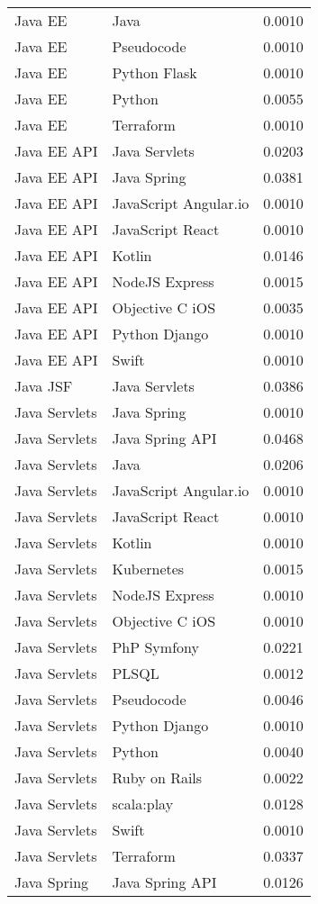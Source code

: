 {\begin{longtable}{lll}
Java EE & Java & 0.0010\\
Java EE & Pseudocode & 0.0010\\
Java EE & Python Flask & 0.0010\\
Java EE & Python & 0.0055\\
Java EE & Terraform & 0.0010\\
Java EE API & Java Servlets & 0.0203\\
Java EE API & Java Spring & 0.0381\\
Java EE API & JavaScript Angular.io & 0.0010\\
Java EE API & JavaScript React & 0.0010\\
Java EE API & Kotlin & 0.0146\\
Java EE API & NodeJS Express & 0.0015\\
Java EE API & Objective C iOS & 0.0035\\
Java EE API & Python Django & 0.0010\\
Java EE API & Swift & 0.0010\\
Java JSF & Java Servlets & 0.0386\\
Java Servlets & Java Spring & 0.0010\\
Java Servlets & Java Spring API & 0.0468\\
Java Servlets & Java & 0.0206\\
Java Servlets & JavaScript Angular.io & 0.0010\\
Java Servlets & JavaScript React & 0.0010\\
Java Servlets & Kotlin & 0.0010\\
Java Servlets & Kubernetes & 0.0015\\
Java Servlets & NodeJS Express & 0.0010\\
Java Servlets & Objective C iOS & 0.0010\\
Java Servlets & PhP Symfony & 0.0221\\
Java Servlets & PLSQL & 0.0012\\
Java Servlets & Pseudocode & 0.0046\\
Java Servlets & Python Django & 0.0010\\
Java Servlets & Python & 0.0040\\
Java Servlets & Ruby on Rails & 0.0022\\
Java Servlets & scala:play & 0.0128\\
Java Servlets & Swift & 0.0010\\
Java Servlets & Terraform & 0.0337\\
Java Spring & Java Spring API & 0.0126\\

\end{longtable}}
